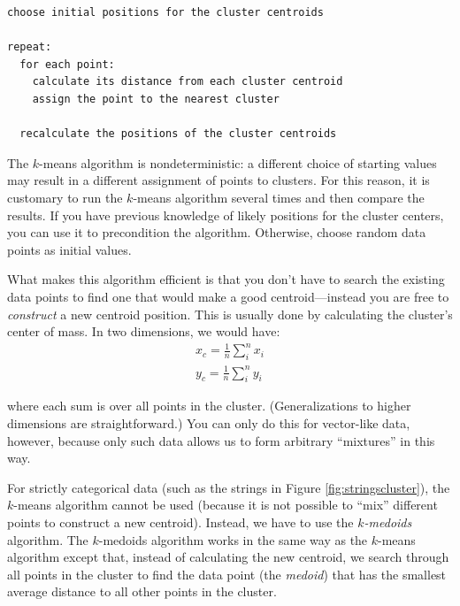 \begin{verbatim}
choose initial positions for the cluster centroids

repeat:
  for each point:
    calculate its distance from each cluster centroid
    assign the point to the nearest cluster

  recalculate the positions of the cluster centroids
\end{verbatim}

The $k$-means algorithm is nondeterministic: a different choice of
starting values may result in a different assignment of
points to clusters. For this reason, it is customary to run the
$k$-means algorithm several times and then compare the results. If you
have previous knowledge of likely positions for the cluster centers,
you can use it to precondition the algorithm. Otherwise, choose random
data points as initial values.

What makes this algorithm efficient is that you don't have to search
the existing data points to find one that would make a good
centroid---instead you are free to \emph{construct} a new centroid
position. This is usually done by calculating the cluster's
center of mass. In two dimensions, we would have:
\begin{gather*}
x_c = \frac{1}{n} \sum_i^n x_i \\
y_c = \frac{1}{n} \sum_i^n y_i
\end{gather*}\vspace*{-6pt}\pagebreak

where each sum is over all points in the cluster. (Generalizations to
higher dimensions are straightforward.)  You can only do this for
vector-like data, however, because only such data allows us to form
arbitrary ``mixtures'' in this way.

For strictly categorical data (such as the strings in Figure
\ref{fig:stringscluster}), the $k$-means algorithm cannot be used
(because it is not possible to ``mix'' different points to construct a
new centroid). Instead, we have to use the \emph{$k$-medoids}
algorithm.   The $k$-medoids algorithm works in the same way as the
$k$-means algorithm except that, instead of calculating the new
centroid, we search through all points in the cluster to find the data
point (the \emph{medoid}) that has the smallest average distance to
all other points in the cluster.

